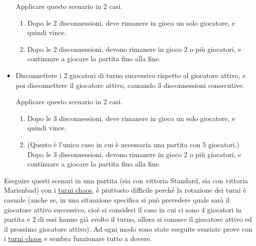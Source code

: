 \begin{itemize}
	Applicare questo scenario in 2 casi.
	\begin{enumerate}
	\item
		Dopo le 2 disconnessioni, deve rimanere in gioco un solo giocatore, e quindi vince.
	\item
		Dopo le 2 disconnessioni, devono rimanere in gioco 2 o più giocatori, e continuare a giocare la partita fino alla fine.
	\end{enumerate}
\item
	Disconnettere i 2 giocatori di turno successivo rispetto al giocatore attivo, e poi disconnettere il giocatore attivo, causando 3 disconnessioni consecutive.
	
	Applicare questo scenario in 2 casi.
	\begin{enumerate}
		\item
		Dopo le 3 disconnessioni, deve rimanere in gioco un solo giocatore, e quindi vince.
		\item
		(Questo è l'unico caso in cui è necessaria una partita con 5 giocatori.) Dopo le 3 disconnessioni, devono rimanere in gioco 2 o più giocatori, e continuare a giocare la partita fino alla fine.
	\end{enumerate}
\end{itemize}
	
\removeHorizontalSpaceBig Eseguire questi scenari in una partita (sia con vittoria Standard, sia con vittoria Marienbad) con i \ul{turni chaos}, è piuttosto difficile perché la rotazione dei turni è casuale (anche se, in una situazione specifica si può prevedere quale sarà il giocatore attivo successivo, cioè si consideri il caso in cui ci sono 4 giocatori in partita e 2 di essi hanno già svolto il turno, allora si conosce il giocatore attivo ed il prossimo giocatore attivo). Ad ogni modo sono state eseguite svariate prove con i \ul{turni chaos} e sembra funzionare tutto a dovere.

\newpage